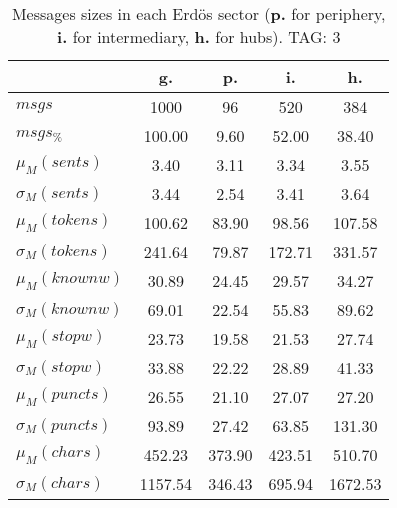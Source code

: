 \begin{table}[h!]
\begin{center}
\begin{tabular}{| l | c | c | c | c |}\hline
 & g. & p. & i. & h. \\\hline
$msgs$ & 1000  & 96  & 520  & 384 \\\hline
$msgs_{\%}$ & 100.00  & 9.60  & 52.00  & 38.40 \\\hline
$\mu_M(sents)$ & 3.40  & 3.11  & 3.34  & 3.55 \\\hline
$\sigma_M(sents)$ & 3.44  & 2.54  & 3.41  & 3.64 \\\hline
$\mu_M(tokens)$ & 100.62  & 83.90  & 98.56  & 107.58 \\\hline
$\sigma_M(tokens)$ & 241.64  & 79.87  & 172.71  & 331.57 \\\hline
$\mu_M(knownw)$ & 30.89  & 24.45  & 29.57  & 34.27 \\\hline
$\sigma_M(knownw)$ & 69.01  & 22.54  & 55.83  & 89.62 \\\hline
$\mu_M(stopw)$ & 23.73  & 19.58  & 21.53  & 27.74 \\\hline
$\sigma_M(stopw)$ & 33.88  & 22.22  & 28.89  & 41.33 \\\hline
$\mu_M(puncts)$ & 26.55  & 21.10  & 27.07  & 27.20 \\\hline
$\sigma_M(puncts)$ & 93.89  & 27.42  & 63.85  & 131.30 \\\hline
$\mu_M(chars)$ & 452.23  & 373.90  & 423.51  & 510.70 \\\hline
$\sigma_M(chars)$ & 1157.54  & 346.43  & 695.94  & 1672.53 \\\hline
\end{tabular}
\caption{Messages sizes in each Erd\"os sector ({{\bf p.}} for periphery, {{\bf i.}} for intermediary, {{\bf h.}} for hubs). TAG: 3}
\end{center}
\end{table}